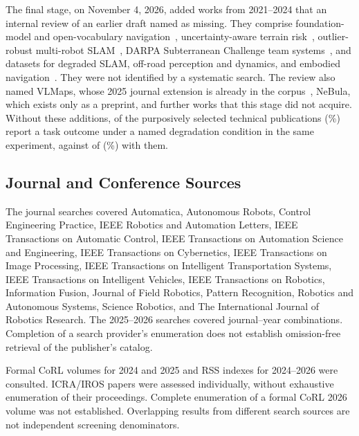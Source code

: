 \documentclass[journal]{IEEEtran}
\begin{document}


The final stage, on November 4, 2026, added \CoverageCount{} works from 2021--2024 that an internal review of an earlier draft named as missing. They comprise foundation-model and open-vocabulary navigation~\cite{P_K12,P_K13,P_K14,P_K16,P_K15}, uncertainty-aware terrain risk~\cite{P_K03,P_K05}, outlier-robust multi-robot SLAM~\cite{P_K06,P_K07}, DARPA Subterranean Challenge team systems~\cite{P_K08,P_K09,P_K10}, and datasets for degraded SLAM, off-road perception and dynamics, and embodied navigation~\cite{P_K01,P_K02,P_K04,P_K11}. They were not identified by a systematic search. The review also named VLMaps, whose 2025 journal extension is already in the corpus~\cite{P_S12}, NeBula, which exists only as a preprint, and further works that this stage did not acquire. Without these additions, \DegTaskCountBase{} of the \CoreCountBase{} purposively selected technical publications (\DegTaskShareBase\%) report a task outcome under a named degradation condition in the same experiment, against \DegTaskCount{} of \CoreCount{} (\DegTaskShare\%) with them.



\subsection{Journal and Conference Sources}

The journal searches covered Automatica, Autonomous Robots, Control Engineering Practice, IEEE Robotics and Automation Letters, IEEE Transactions on Automatic Control, IEEE Transactions on Automation Science and Engineering, IEEE Transactions on Cybernetics, IEEE Transactions on Image Processing, IEEE Transactions on Intelligent Transportation Systems, IEEE Transactions on Intelligent Vehicles, IEEE Transactions on Robotics, Information Fusion, Journal of Field Robotics, Pattern Recognition, Robotics and Autonomous Systems, Science Robotics, and The International Journal of Robotics Research. The 2025--2026 searches covered \QuerySlices{} journal--year combinations. Completion of a search provider's enumeration does not establish omission-free retrieval of the publisher's catalog.

Formal CoRL volumes for 2024 and 2025 and RSS indexes for 2024--2026 were consulted. ICRA/IROS papers were assessed individually, without exhaustive enumeration of their proceedings. Complete enumeration of a formal CoRL 2026 volume was not established. Overlapping results from different search sources are not independent screening denominators.
\end{document}
